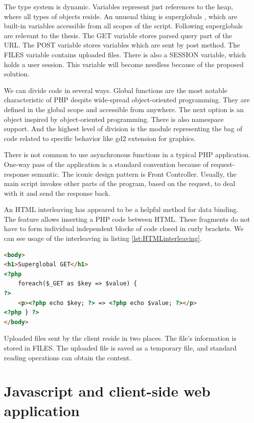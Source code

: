 The type system is dynamic.
Variables represent just references to the heap, where all types of objects reside.
An unusual thing is superglobals , which are built-in variables accessible from all scopes of the script.
Following superglobals are relevant to the thesis.
The GET variable stores parsed query part of the URL.
The POST variable stores variables which are sent by post method.
The FILES variable contains uploaded files.
There is also a SESSION variable, which holds a user session.
This variable will become needless because of the proposed solution.

We can divide code in several ways.
Global functions are the most notable characteristic of PHP despite wide-spread object-oriented programming.
They are defined in the global scope and accessible from anywhere.
The next option is an object inspired by object-oriented programming.
There is also namespace support.
And the highest level of division is the module representing the bag of code related to specific behavior like gd2 extension for graphics.

There is not common to use asynchronous functions in a typical PHP application.
One-way pass of the application is a standard convention because of request-response semantic.
The iconic design pattern is Front Controller.
Usually, the main script invokes other parts of the program, based on the request, to deal with it and send the response back.

An HTML interleaving has appeared to be a helpful method for data binding.
The feature allows inserting a PHP code between HTML.
These fragments do not have to form individual independent blocks of code closed in curly brackets. We can see usage of the interleaving in listing \ref{lst:HTMLinterleaving}.

\begin{lstlisting}[basicstyle=\small, caption=HTML interleaving.,
  language=HTML, label={lst:HTMLinterleaving}]
<body>
<h1>Superglobal GET</h1>
<?php
	foreach($_GET as $key => $value) {
?>
	<p><?php echo $key; ?> => <?php echo $value; ?></p>
<?php } ?>
</body>
\end{lstlisting}

Uploaded files sent by the client reside in two places.
The file's information is stored in FILES.
The uploaded file is saved as a temporary file, and standard reading operations can obtain the content.

\section{Javascript and client-side web application}

